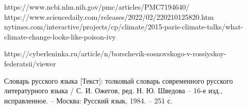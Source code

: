 
\begin{thebibliography}{99}
	https://www.ncbi.nlm.nih.gov/pmc/articles/PMC7194640/
	https://www.sciencedaily.com/releases/2022/02/220210125820.htm
	nytimes.com/interactive/projects/cp/climate/2015-paris-climate-talks/what-climate-change-looks-like-poison-ivy
	
	https://cyberleninka.ru/article/n/borschevik-sosnovskogo-v-rossiyskoy-federatsii/viewer
	
	Словарь русского языка [Текст]: толковый словарь современного русского литературного языка / С. И. Ожегов, ред. Н. Ю. Шведова – 16-е изд., исправленное. – Москва: Русский язык, 1984. – 251 с.
\end{thebibliography}
